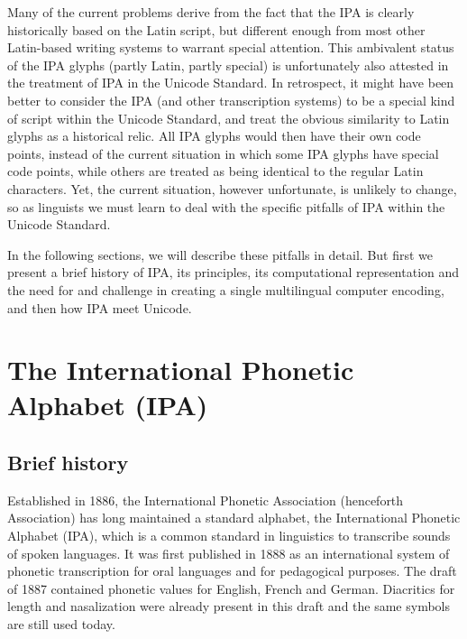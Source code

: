 Many of the current problems derive from the fact that the
IPA is clearly historically based on the Latin script, but different enough from
most other Latin-based writing systems to warrant special attention. This
ambivalent status of the IPA glyphs (partly Latin, partly special) is
unfortunately also attested in the treatment of IPA in the Unicode Standard. In
retrospect, it might have been better to consider the IPA (and other
transcription systems) to be a special kind of script within the Unicode
Standard, and treat the obvious similarity to Latin glyphs as a historical
relic. All IPA glyphs would then have their own code points, instead of the
current situation in which some IPA glyphs have special code points, while
others are treated as being identical to the regular Latin characters. Yet, the
current situation, however unfortunate, is unlikely to change, so as linguists
we must learn to deal with the specific pitfalls of IPA within the Unicode
Standard. 

In the following sections, we will describe these pitfalls 
in detail. But first we present a brief history of IPA, its principles, 
its computational representation and the need for and challenge in creating 
a single multilingual computer encoding, and then how IPA meet Unicode.

\section{The International Phonetic Alphabet (IPA)}
\label{the-international-phonetic-alphabet}

\subsection{Brief history}

Established in 1886, the International Phonetic Association (henceforth Association) 
has long maintained a standard alphabet, the International Phonetic Alphabet (IPA),
which is a common standard in linguistics to transcribe sounds of spoken
languages. It was first published in 1888 as an international system of phonetic
transcription for oral languages and for pedagogical purposes. The draft of 1887
contained phonetic values for English, French and German. Diacritics for length
and nasalization were already present in this draft and the same symbols are
still used today. 

